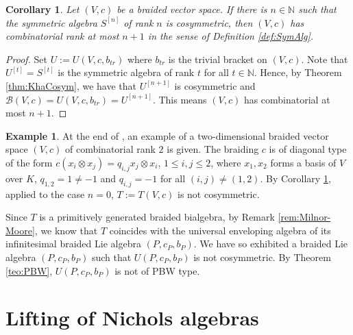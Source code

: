\documentclass[english]{amsart}
\numberwithin{equation}{section}
\numberwithin{figure}{section}
\theoremstyle{plain}
\theoremstyle{definition}
\theoremstyle{definition}
\newtheorem{example}[thm]{Example}
\theoremstyle{remark}
\theoremstyle{remark}
\theoremstyle{plain}
\theoremstyle{plain}
\theoremstyle{plain}
\newtheorem{cor}[thm]{Corollary}
\begin{document}
\begin{cor}
\label{cor:KhaCosym}Let $\left(V,c\right)$ be a braided vector space.
If there is $n\in\mathbb{N}$ such that the symmetric algebra $S^{\left[n\right]}$
of rank $n$ is cosymmetric, then $\left(V,c\right)$ has combinatorial
rank at most $n+1$ in the sense of Definition \ref{def:SymAlg}.\end{cor}
\begin{proof}
Set $U:=U\left(V,c,b_{tr}\right)$ where $b_{tr}$ is the trivial
bracket on $(V,c)$. Note that $U^{\left[t\right]}=S^{[t]}$ is the
symmetric algebra of rank $t$ for all $t\in\mathbb{N}$. Hence, by
Theorem \ref{thm:KhaCosym}, we have that $U^{\left[n+1\right]}$
is cosymmetric and $\mathcal{B}\left(V,c\right)=U\left(V,c,b_{tr}\right)=U^{\left[n+1\right]}$.
This means $\left(V,c\right)$ has combinatorial at most $n+1$.\end{proof}
\begin{example}
\label{ex:Cosymm}At the end of \cite{Kharchenko-SkewPrim}, an example
of a two-dimensional braided vector space $\left(V,c\right)$ of combinatorial
rank $2$ is given. The braiding $c$ is of diagonal type of the form
$c\left(x_{i}\otimes x_{j}\right)=q_{i,j}x_{j}\otimes x_{i}$, $1\leq i,j\leq2$,
where $x_{1},x_{2}$ forms a basis of $V$ over $K$, $q_{1,2}=1\neq-1$
and $q_{i,j}=-1$ for all $\left(i,j\right)\neq\left(1,2\right)$.
By Corollary \ref{cor:KhaCosym}, applied to the case $n=0$, $T:=T\left(V,c\right)$
is not cosymmetric.

Since $T$ is a primitively generated braided bialgebra, by Remark
\ref{rem:Milnor-Moore}, we know that $T$ coincides with the universal
enveloping algebra of its infinitesimal braided Lie algebra $\left(P,c_{P},b_{P}\right)$.
We have so exhibited a braided Lie algebra $\left(P,c_{P},b_{P}\right)$
such that $U\left(P,c_{P},b_{P}\right)$ is not cosymmetric. By Theorem
\ref{teo:PBW}, $U\left(P,c_{P},b_{P}\right)$ is not of PBW type.
\end{example}



\section{Lifting of Nichols algebras \label{sec:Lifting}}
\end{document}
